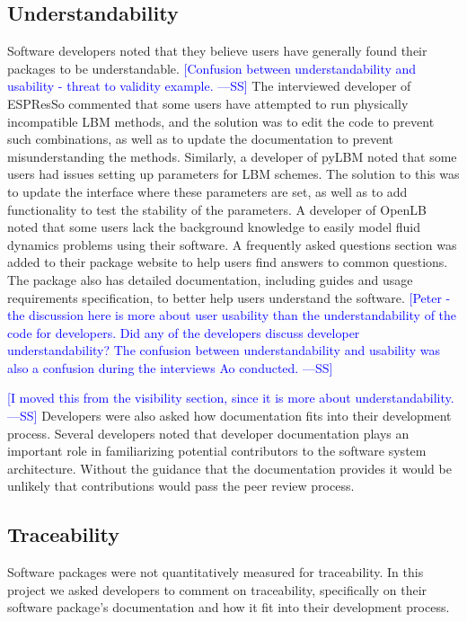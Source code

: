 \documentclass[final, 3p, times, authoryear]{elsarticle}
\newcommand{\authornote}[3]{\textcolor{#1}{[#3 ---#2]}}
\newcommand{\authornote}[3]{}
\newcommand{\wss}[1]{\authornote{blue}{SS}{#1}} %
\begin{document}
\subsection{Understandability}

Software developers noted that they believe users have generally found their
packages to be understandable. \wss{Confusion between understandability and
usability - threat to validity example.}  The interviewed developer of ESPResSo
commented that some users have attempted to run physically incompatible LBM
methods, and the solution was to edit the code to prevent such combinations, as
well as to update the documentation to prevent misunderstanding the methods.
Similarly, a developer of pyLBM noted that some users had issues setting up
parameters for LBM schemes. The solution to this was to update the interface
where these parameters are set, as well as to add functionality to test the
stability of the parameters. A developer of OpenLB noted that some users lack
the background knowledge to easily model fluid dynamics problems using their
software. A frequently asked questions section was added to their package
website to help users find answers to common questions. The package also has
detailed documentation, including guides and usage requirements specification,
to better help users understand the software.  \wss{Peter - the discussion here
is more about user usability than the understandability of the code for
developers.  Did any of the developers discuss developer understandability?  The
confusion between understandability and usability was also a confusion during
the interviews Ao conducted.}

\wss{I moved this from the visibility section, since it is more about
understandability.}  Developers were also asked how documentation fits into their
development process. Several developers noted that developer documentation plays
an important role in familiarizing potential contributors to the software system
architecture. Without the guidance that the documentation provides it would be
unlikely that contributions would pass the peer review process. 

\subsection{Traceability}

Software packages were not quantitatively measured for traceability. In this
project we asked developers to comment on traceability, specifically on their
software package's documentation and how it fit into their development process. 
\end{document}
